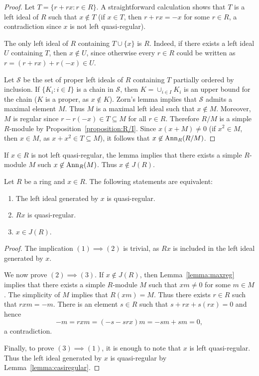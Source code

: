 \begin{proof}
	Let $T=\{r+rx:r\in R\}$. A straightforward calculation shows that $T$ is a left ideal of 
	$R$ such that $x\not\in T$ (if $x\in T$, then $r+rx=-x$ for some 
	$r\in R$, a contradiction since $x$ is not left quasi-regular). 

	The only left ideal of $R$ containing 
	$T\cup\{x\}$ is $R$. Indeed, if there exists a left ideal $U$ containing $T$, then 
    $x\not\in U$, since otherwise every $r\in R$ could be written as 
	$r=(r+rx)+r(-x)\in U$. 

	Let $\mathcal{S}$ be the set of proper left ideals of $R$ containing 
	$T$ partially ordered by inclusion. If $\{K_i:i\in I\}$ is a chain in 
	$\mathcal{S}$, then $K=\cup_{i\in I}K_i$ is an upper bound for the chain 
	($K$ is a proper, as $x\not\in K$). Zorn's lemma implies that 
	$\mathcal{S}$ admits a maximal element $M$. Thus $M$
	is a maximal left ideal such that $x\not\in M$. Moreover, $M$ is regular
	since $r-r(-x)\in T\subseteq M$ for all $r\in R$. Therefore $R/M$ is a simple 
	$R$-module by Proposition~\ref{proposition:R/I}. Since $x(x+M)\ne
	0$ (if $x^2\in M$, then  $x\in M$, as $x+x^2\in
	T\subseteq M$), it follows that $x\not\in\operatorname{Ann}_R(R/M)$.
\end{proof}

If $x\in R$ is not left quasi-regular, the lemma implies that there exists 
a simple $R$-module $M$ such $x\not\in\operatorname{Ann}_R(M)$. Thus 
$x\not\in J(R)$.

\begin{theorem}
	\label{thm:casireg_eq}
	Let $R$ be a ring and $x\in R$. The following statements are equivalent: 
	\begin{enumerate}
		\item The left ideal generated by $x$ is quasi-regular.
		\item $Rx$ is quasi-regular.
		\item $x\in J(R)$.
	\end{enumerate}
\end{theorem}

\begin{proof}
	The implication $(1)\implies(2)$ is trivial, as $Rx$ is included in the left ideal 
	generated by $x$.  
	
	We now prove $(2)\implies(3)$. If
	$x\not\in J(R)$, then Lemma~\ref{lemma:maxreg} implies that there exists a simple 
	$R$-module $M$ such that $xm\ne 0$ for some $m\in M$. The simplicity of $M$ implies
	that $R(xm)=M$. Thus there exists $r\in R$ such that $rxm=-m$. There is an element 
	$s\in R$ such that $s+rx+s(rx)=0$ and hence 
	\[
	-m=rxm=(-s-srx)m=-sm+sm=0,
	\]
	a contradiction. 
	
	Finally, to prove $(3)\implies(1)$, it is enough to note that 
	$x$ is left quasi-regular. Thus the left ideal generated by 
	$x$ is quasi-regular by Lemma~\ref{lemma:casiregular}.
\end{proof}

